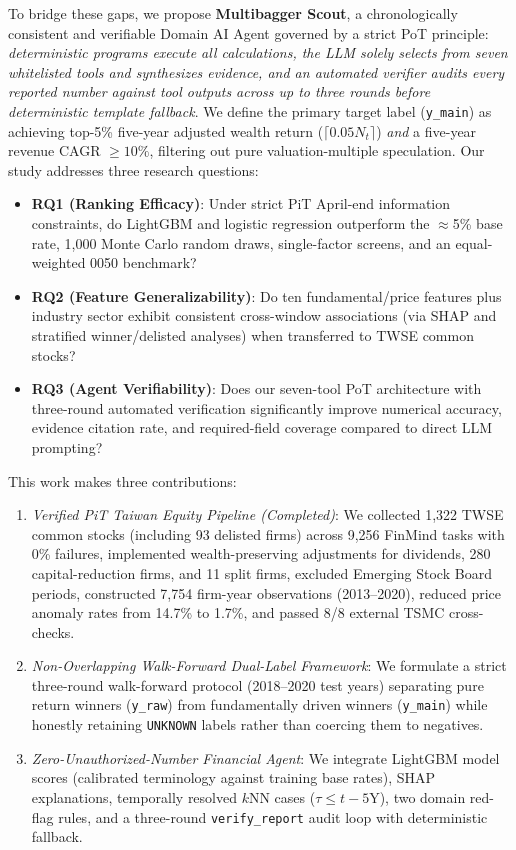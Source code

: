 \documentclass[conference]{IEEEtran}
\begin{document}
To bridge these gaps, we propose \textbf{Multibagger Scout}, a chronologically consistent and verifiable Domain AI Agent governed by a strict PoT principle: \emph{deterministic programs execute all calculations, the LLM solely selects from seven whitelisted tools and synthesizes evidence, and an automated verifier audits every reported number against tool outputs across up to three rounds before deterministic template fallback}. We define the primary target label (\texttt{y\_main}) as achieving top-5\% five-year adjusted wealth return ($\lceil 0.05 N_t \rceil$) \emph{and} a five-year revenue CAGR $\ge 10\%$, filtering out pure valuation-multiple speculation. Our study addresses three research questions:
\begin{itemize}
    \item \textbf{RQ1 (Ranking Efficacy)}: Under strict PiT April-end information constraints, do LightGBM and logistic regression outperform the $\approx$5\% base rate, 1,000 Monte Carlo random draws, single-factor screens, and an equal-weighted 0050 benchmark?
    \item \textbf{RQ2 (Feature Generalizability)}: Do ten fundamental/price features plus industry sector exhibit consistent cross-window associations (via SHAP and stratified winner/delisted analyses) when transferred to TWSE common stocks?
    \item \textbf{RQ3 (Agent Verifiability)}: Does our seven-tool PoT architecture with three-round automated verification significantly improve numerical accuracy, evidence citation rate, and required-field coverage compared to direct LLM prompting?
\end{itemize}

This work makes three contributions:
\begin{enumerate}
    \item \emph{Verified PiT Taiwan Equity Pipeline (Completed)}: We collected 1,322 TWSE common stocks (including 93 delisted firms) across 9,256 FinMind tasks with 0\% failures, implemented wealth-preserving adjustments for dividends, 280 capital-reduction firms, and 11 split firms, excluded Emerging Stock Board periods, constructed 7,754 firm-year observations (2013--2020), reduced price anomaly rates from 14.7\% to 1.7\%, and passed 8/8 external TSMC cross-checks.
    \item \emph{Non-Overlapping Walk-Forward Dual-Label Framework}: We formulate a strict three-round walk-forward protocol (2018--2020 test years) separating pure return winners (\texttt{y\_raw}) from fundamentally driven winners (\texttt{y\_main}) while honestly retaining \texttt{UNKNOWN} labels rather than coercing them to negatives.
    \item \emph{Zero-Unauthorized-Number Financial Agent}: We integrate LightGBM model scores (calibrated terminology against training base rates), SHAP explanations, temporally resolved $k$NN cases ($\tau \le t - 5\text{Y}$), two domain red-flag rules, and a three-round \texttt{verify\_report} audit loop with deterministic fallback.
\end{enumerate}
\end{document}
